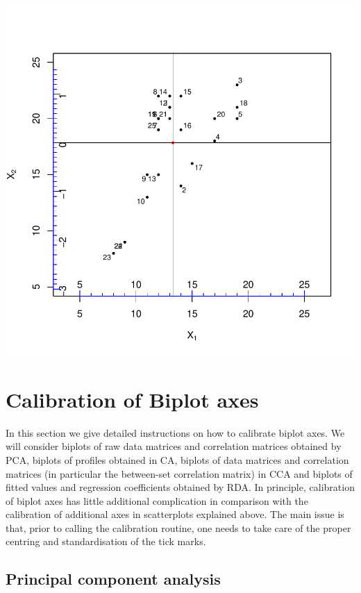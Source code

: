\documentclass[a4paper]{article}
\begin{document}
\includegraphics{CalibrationGuide-010}

\section{Calibration of Biplot axes}
\label{sec:biplot}

In this section we give detailed instructions on how to calibrate biplot axes. We will consider biplots 
of raw data matrices and correlation matrices obtained by PCA, biplots of profiles obtained in CA,
biplots of data matrices and correlation matrices (in particular the between-set correlation matrix) 
in CCA and biplots of fitted values and regression coefficients obtained by RDA. In principle, calibration
of biplot axes has little additional complication in comparison with the calibration of additional 
axes in scatterplots explained above. The main issue is that, prior to calling the calibration routine,
one needs to take care of the proper centring and standardisation of the tick marks. 

\subsection{Principal component analysis}
\label{sec:pca}
\end{document}

